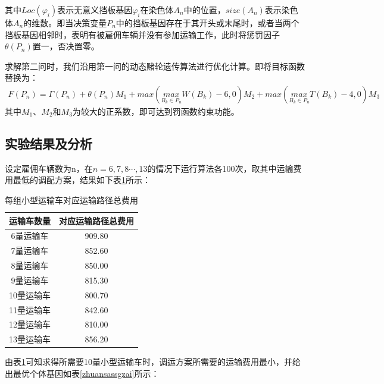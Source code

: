 \documentclass{whutmod}
\begin{document}
其中$Loc(\varphi_i )$表示无意义挡板基因$\varphi_i$在染色体$A_n$中的位置，$size(A_n)$表示染色体$A_n$的维数。即当决策变量$P_n$中的挡板基因存在于其开头或末尾时，或者当两个挡板基因相邻时，表明有被雇佣车辆并没有参加运输工作，此时将惩罚因子$\theta(P_n)$置一，否决置零。

求解第二问时，我们沿用第一问的动态赌轮遗传算法进行优化计算。即将目标函数替换为：
\begin{gather}
F(P_n)= \Gamma (P_n)+\theta(P_n)M_1+max(\underset{B_k\in P_n}{max} W (B_k)-6 ,0) M_2+max(\underset{B_k\in P_n}{max}T (B_k)-4,0)M_3
\end{gather}
其中$M_1$、$M_2$和$M_3$为较大的正系数，即可达到罚函数约束功能。
 
  
        \subsection{实验结果及分析}
%  
  设定雇佣车辆数为n，在$n=6,7,8\cdots,13$的情况下运行算法各100次，取其中运输费用最低的调配方案，结果如下表\ref{zhuanssssasgzai}所示：
  	\begin{table}[H]
	\centering		
	\caption{每组小型运输车对应运输路径总费用}\label{zhuanssssasgzai}
	\begin{tabular}{cc}
		\toprule[2pt]
		\multicolumn{1}{m{5cm}}{\centering 运输车数量}
		& \multicolumn{1}{m{5cm}}{\centering 对应运输路径总费用}
		\\
		\midrule[1pt]
		6量运输车 &   909.80\\ 
		7量运输车 & 	852.60\\ 
		8量运输车 &  	850.00 \\ 
		9量运输车 &  815.30 \\ 
		10量运输车 &   800.70\\ 
	11量运输车 & 	842.60 \\ 
		12量运输车 &810.00\\ 
		13量运输车 & 	856.20\\ 
		\bottomrule[2pt]	
	\end{tabular}
\end{table}
  
  由表\ref{zhuanssssasgzai}可知求得所需要10量小型运输车时，调运方案所需要的运输费用最小，并给出最优个体基因如表\ref{zhuansassgzai}所示：%
  
\end{document}
